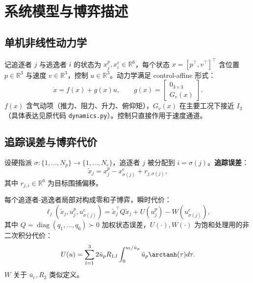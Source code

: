 \documentclass[11pt,a4paper]{article}
\DeclareMathOperator{\diag}{diag}
\newcommand{\R}{\mathbb{R}}
\newcommand{\ubar}{\bar{u}}
\theoremstyle{remark}
\begin{document}
\section{系统模型与博弈描述}\label{sec:hji}

\subsection{单机非线性动力学}

记追逐者 $j$ 与逃逸者 $i$ 的状态为 $x_j^p,x_i^e\in\R^6$，每个状态 $x=[p^\top,v^\top]^\top$ 含位置 $p\in\R^3$ 与速度 $v\in\R^3$，控制 $u\in\R^3$。动力学满足 control-affine 形式：
\begin{equation}
\dot x = f(x)+g(x)u,\qquad
g(x)=\begin{bmatrix}0_{3\times 3}\\ G_v(x)\end{bmatrix}.
\label{eq:dynamics}
\end{equation}
$f(x)$ 含气动项（推力、阻力、升力、俯仰矩），$G_v(x)$ 在主要工况下接近 $I_3$（具体表达见原代码 \texttt{dynamics.py}）。控制只直接作用于速度通道。

\subsection{追踪误差与博弈代价}

设硬指派 $\sigma:\{1,\dots,N_p\}\to\{1,\dots,N_e\}$，追逐者 $j$ 被分配到 $i=\sigma(j)$。\textbf{追踪误差}：
\begin{equation}
\tilde x_j = x_j^p-x_{\sigma(j)}^e+r_{j,\sigma(j)},
\label{eq:tracking_error}
\end{equation}
其中 $r_{j,i}\in\R^6$ 为目标围捕偏移。

每个追逐者-逃逸者局部对构成零和子博弈，瞬时代价：
\begin{equation}
\ell_j(\tilde x_j,u_j^p,u_{\sigma(j)}^e)
=\tilde x_j^\top Q\tilde x_j+U(u_j^p)-W(u_{\sigma(j)}^e),
\label{eq:stage_cost}
\end{equation}
其中 $Q=\diag(q_1,\dots,q_6)\succ 0$ 加权状态误差，$U(\cdot),W(\cdot)$ 为饱和处理用的非二次积分代价：
\begin{equation}
U(u)=\sum_{l=1}^3 2\ubar_p R_{1,l}\int_0^{u_l/\ubar_p}\ubar_p\arctanh(\tau)d\tau.
\label{eq:nonquadratic_U}
\end{equation}
$W$ 关于 $\ubar_e,R_2$ 类似定义。
\end{document}
